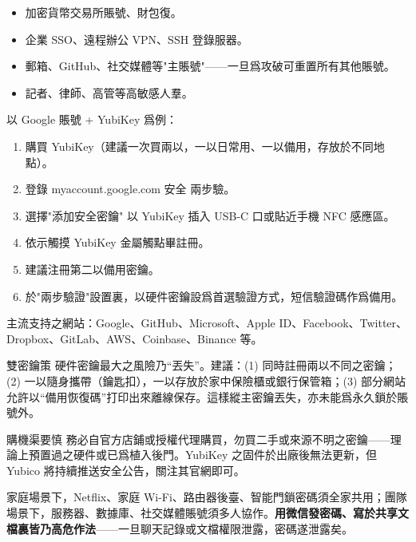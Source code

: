
\begin{itemize}
  \item 加密貨幣交易所賬號、財包復。
  \item 企業 SSO、遠程辦公 VPN、SSH 登錄服器。
  \item 郵箱、GitHub、社交媒體等"主賬號"——一旦爲攻破可重置所有其他賬號。
  \item 記者、律師、高管等高敏感人羣。
\end{itemize}


以 Google 賬號 + YubiKey 爲例：

\begin{enumerate}
  \item 購買 YubiKey（建議一次買兩以，一以日常用、一以備用，存放於不同地點）。
  \item 登錄 myaccount.google.com 安全 兩步驗。
  \item 選擇"添加安全密鑰" 以 YubiKey 插入 USB-C 口或貼近手機 NFC 感應區。
  \item 依示觸摸 YubiKey 金屬觸點畢註冊。
  \item 建議注冊第二以備用密鑰。
  \item 於"兩步驗證"設置裏，以硬件密鑰設爲首選驗證方式，短信驗證碼作爲備用。
\end{enumerate}

主流支持之網站：Google、GitHub、Microsoft、Apple ID、Facebook、Twitter、Dropbox、GitLab、AWS、Coinbase、Binance 等。

\begin{tcbinfo}{雙密鑰策}
硬件密鑰最大之風險乃“丟失”。建議：(1) 同時註冊兩以不同之密鑰；(2) 一以隨身攜帶（鑰匙扣），一以存放於家中保險櫃或銀行保管箱；(3) 部分網站允許以“備用恢復碼”打印出來離線保存。這樣縱主密鑰丟失，亦未能爲永久鎖於賬號外。

\end{tcbinfo}

\begin{tcbwarn}{購機渠要慎}
務必自官方店鋪或授權代理購買，勿買二手或來源不明之密鑰——理論上預置過之硬件或已爲植入後門。YubiKey 之固件於出廠後無法更新，但 Yubico 將持續推送安全公告，關注其官網即可。

\end{tcbwarn}


家庭場景下，Netflix、家庭 Wi-Fi、路由器後臺、智能門鎖密碼須全家共用；團隊場景下，服務器、數據庫、社交媒體賬號須多人協作。\textbf{用微信發密碼、寫於共享文檔裏皆乃高危作法}——一旦聊天記錄或文檔權限泄露，密碼遂泄露矣。

